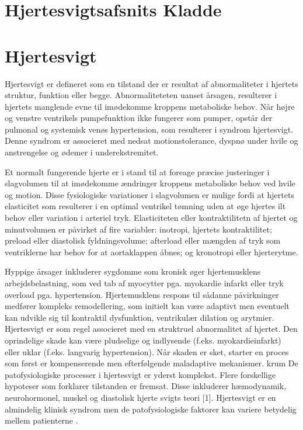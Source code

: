 \section{Hjertesvigtsafsnits Kladde}

\section{Hjertesvigt}

Hjertesvigt er defineret som en tilstand der er resultat af abnormaliteter i hjertets struktur, funktion eller begge. Abnormaliteteten uanset årsagen, resulterer i hjertets manglende evne til imødekomme kroppens metaboliske behov. \citep{Shah2011} \citep{Fletcher2001} \citep{Francis1998} \citep{Mudd2008} Når højre og venstre ventrikels pumpefunktion ikke fungerer som pumper, opstår der pulmonal og systemisk venøs hypertension, som resulterer i syndrom hjertesvigt. Denne syndrom er associeret med nedsat motionstolerance, dyspnø under hvile og anstrengelse og ødemer i underekstremitet. \citep{Francis1998}

Et normalt fungerende hjerte er i stand til at foreage præcise justeringer i slagvolumen til at imødekomme ændringer kroppens metaboliske behov ved hvile og motion. Disse fysiologiske variationer i slagvolumen er mulige fordi at hjertets elasticitet som resulterer i en optimal ventrikel tømning uden at øge hjertes ilt behov eller variation i arteriel tryk. Elasticiteten eller kontraktilitetn af hjertet og minutvolumen er påvirket af fire variabler: inotropi, hjertets kontraktilitet; preload eller diastolisk fyldningsvolume; afterload eller mængden af tryk som ventriklerne har behov for at aortaklappen åbnes; og kronotropi eller hjerterytme. \citep{Fletcher2001}  

%
Hyppige årsager inkluderer sygdomme som kronisk øger hjertemusklens arbejdsbelastning, som ved tab af myocytter pga. myokardie infarkt eller tryk overload pga. hypertension. Hjertemusklens respons til sådanne påvirkninger medfører kompleks remodellering, som initielt kan være adaptivt men eventuelt kan udvikle sig til kontraktil dysfunktion, ventrikulær dilation og arytmier. \citep{Shah2011}
Hjertesvigt er som regel associeret med en struktruel abnormalitet af hjertet. Den oprindelige skade kan være pludselige og indlysende (f.eks. myokardieinfarkt) eller uklar (f.eks. langvarig hypertension). Når skaden er sket, starter en proces som først er kompenserende men efterfølgende maladaptive mekanismer. krum
De patofysiologiske processer i hjertesvigt er yderst komplekst. Flere forskellige hypoteser som forklarer tilstanden er fremsat. Disse inkluderer hæmodynamik, neurohormonel, muskel og diastolisk hjerte svigts teori [1]. 
Hjertesvigt er en almindelig klinisk syndrom men de patofysiologiske faktorer kan variere betydelig mellem patienterne \citep{Parmley1985}. 

